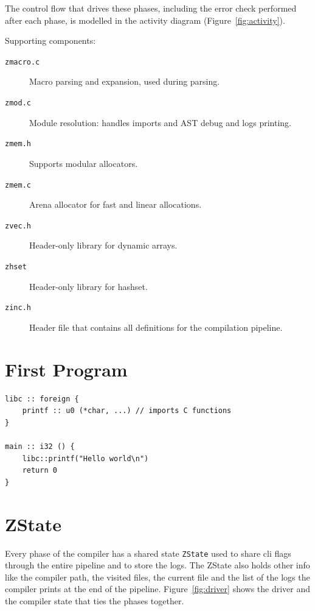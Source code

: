 The control flow that drives these phases, including the error check performed
after each phase, is modelled in the activity diagram
(Figure~\ref{fig:activity}).


Supporting components:

\begin{description}
    \item[\texttt{zmacro.c}] Macro parsing and expansion, used during parsing.
    \item[\texttt{zmod.c}] Module resolution: handles  imports and AST debug and logs printing.
    \item[\texttt{zmem.h}] Supports modular allocators.
    \item[\texttt{zmem.c}] Arena allocator for fast and linear allocations.
    \item[\texttt{zvec.h}] Header-only library for dynamic arrays.
    \item[\texttt{zhset}] Header-only library for hashset.
    \item[\texttt{zinc.h}] Header file that contains all definitions for the compilation pipeline.
\end{description}

\section{First Program}

\begin{lstlisting}[style=zinc]
libc :: foreign {
    printf :: u0 (*char, ...) // imports C functions
}

main :: i32 () {
    libc::printf("Hello world\n")
    return 0
}
\end{lstlisting}

\section{ZState}
Every phase of the compiler has a shared state \texttt{ZState} used to share cli flags through the entire pipeline and to store the logs.
The ZState also holds other info like the compiler path, the visited files, the current file and the list of the logs the compiler prints at the end of the pipeline.
Figure~\ref{fig:driver} shows the driver and the compiler state that ties the phases together.

